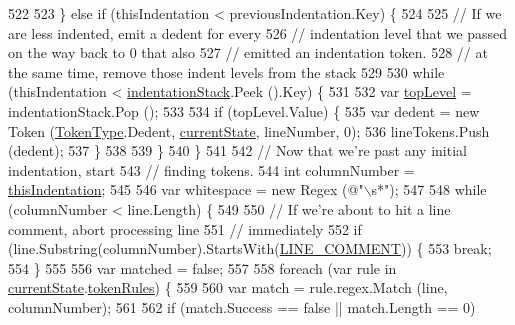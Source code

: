 \begin{DoxyCode}
522 
523             \} \textcolor{keywordflow}{else} \textcolor{keywordflow}{if} (thisIndentation < previousIndentation.Key) \{
524 
525                 \textcolor{comment}{// If we are less indented, emit a dedent for every}
526                 \textcolor{comment}{// indentation level that we passed on the way back to 0 that also}
527                 \textcolor{comment}{// emitted an indentation token.}
528                 \textcolor{comment}{// at the same time, remove those indent levels from the stack}
529 
530                 \textcolor{keywordflow}{while} (thisIndentation < \hyperlink{a00117_a6631a1b1a9109258ab18927e7587ff9b}{indentationStack}.Peek ().Key) \{
531 
532                     var \hyperlink{a00330_a8b7e5c0b2c6870eaa8f9454b4f33678b}{topLevel} = indentationStack.Pop ();
533 
534                     \textcolor{keywordflow}{if} (topLevel.Value) \{
535                         var dedent = \textcolor{keyword}{new} Token (\hyperlink{a00041_a301aa7c866593a5b625a8fc158bbeace}{TokenType}.Dedent, 
      \hyperlink{a00117_ac90b7dce8103425a148f9e8588f14137}{currentState}, lineNumber, 0);
536                         lineTokens.Push (dedent);
537                     \}
538 
539                 \}
540             \}
541 
542             \textcolor{comment}{// Now that we're past any initial indentation, start}
543             \textcolor{comment}{// finding tokens.}
544             \textcolor{keywordtype}{int} columnNumber = \hyperlink{a00330_a0e59365a4aa5811f6495b92a51e23573}{thisIndentation};
545 
546             var whitespace = \textcolor{keyword}{new} Regex (\textcolor{stringliteral}{@"\(\backslash\)s*"});
547 
548             \textcolor{keywordflow}{while} (columnNumber < line.Length) \{
549 
550                 \textcolor{comment}{// If we're about to hit a line comment, abort processing line}
551                 \textcolor{comment}{// immediately}
552                 \textcolor{keywordflow}{if} (line.Substring(columnNumber).StartsWith(\hyperlink{a00117_a29c457125cc4876f8571f5d9afa372e2}{LINE\_COMMENT})) \{
553                     \textcolor{keywordflow}{break};
554                 \}
555 
556                 var matched = \textcolor{keyword}{false};
557 
558                 \textcolor{keywordflow}{foreach} (var rule \textcolor{keywordflow}{in} \hyperlink{a00117_ac90b7dce8103425a148f9e8588f14137}{currentState}.\hyperlink{a00118_adf6563b1dc6f3ef80ed13c2b15b7be03}{tokenRules}) \{
559 
560                     var match = rule.regex.Match (line, columnNumber);
561 
562                     \textcolor{keywordflow}{if} (match.Success == \textcolor{keyword}{false} || match.Length == 0)

\end{DoxyCode}
